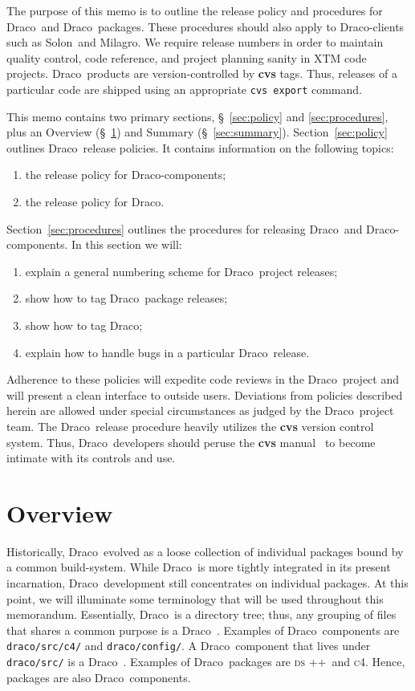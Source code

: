\documentclass[11pt]{nmemo}
\newcommand{\draco}{{\normalfont\normalsize\sffamily Draco}}
\newcommand{\milagro}{{\normalfont\normalsize\sffamily Milagro}}
\newcommand{\solon}{{\normalfont\normalsize\sffamily Solon}}
\newcommand{\cfour}{{\normalfont\normalsize\scshape c\small 4}}
\newcommand{\dsxx}{{\normalfont\normalsize\scshape ds\raisebox{.2ex}
  {\scriptsize ++}}}
\begin{document}
The purpose of this memo is to outline the release policy and
procedures for \draco\ and \draco\ packages.  These procedures should
also apply to \draco-clients such as \solon\ and \milagro.  We require
release numbers in order to maintain quality control, code reference,
and project planning sanity in XTM code projects.  \draco\ products
are version-controlled by {\bf cvs} tags.  Thus, releases of a
particular code are shipped using an appropriate \texttt{cvs export}
command.

This memo contains two primary sections, \S~\ref{sec:policy} and
\ref{sec:procedures}, plus an Overview (\S~\ref{sec:overview}) and
Summary (\S~\ref{sec:summary}).  Section~\ref{sec:policy} outlines
\draco\ release policies.  It contains information on the following
topics:
\begin{enumerate}
\item the release policy for \draco-components;
\item the release policy for \draco.
\end{enumerate}
Section~\ref{sec:procedures} outlines the procedures for releasing
\draco\ and \draco-components.  In this section we will:
\begin{enumerate}
\item explain a general numbering scheme for \draco\ project releases;
\item show how to tag \draco\ package releases;
\item show how to tag \draco;
\item explain how to handle bugs in a particular \draco\ release.
\end{enumerate}
Adherence to these policies will expedite code reviews in the \draco\ 
project and will present a clean interface to outside users.
Deviations from policies described herein are allowed under special
circumstances as judged by the \draco\ project team.  The \draco\ 
release procedure heavily utilizes the {\bf cvs} version control
system.  Thus, \draco\ developers should peruse the {\bf cvs}
manual~\cite{cvs} to become intimate with its controls and use.


\section{Overview}
\label{sec:overview}

Historically, \draco\ evolved as a loose collection of individual
packages bound by a common build-system.  While \draco\ is more
tightly integrated in its present incarnation, \draco\ development
still concentrates on individual packages.  At this point, we will
illuminate some terminology that will be used throughout this
memorandum.  Essentially, \draco\ is a directory tree; thus, any
grouping of files that shares a common purpose is a \draco\ 
.  Examples of \draco\ components are
\texttt{draco/src/c4/} and \texttt{draco/config/}.  A \draco\ 
component that lives under \texttt{draco/src/} is a \draco\ 
.  Examples of \draco\ packages are \dsxx\ and \cfour.
Hence, packages are also \draco\ components.
\end{document}
